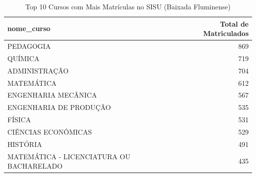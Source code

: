 \begin{table}
\caption{Top 10 Cursos com Mais Matrículas no SISU (Baixada Fluminense)}
\label{tab:ranking_cursos}
\begin{tabular}{lr}
\toprule
nome_curso & Total de Matriculados \\
\midrule
PEDAGOGIA & 869 \\
QUÍMICA & 719 \\
ADMINISTRAÇÃO & 704 \\
MATEMÁTICA & 612 \\
ENGENHARIA MECÂNICA & 567 \\
ENGENHARIA DE PRODUÇÃO & 535 \\
FÍSICA & 531 \\
CIÊNCIAS ECONÔMICAS & 529 \\
HISTÓRIA & 491 \\
MATEMÁTICA - LICENCIATURA OU BACHARELADO & 435 \\
\bottomrule
\end{tabular}
\end{table}
